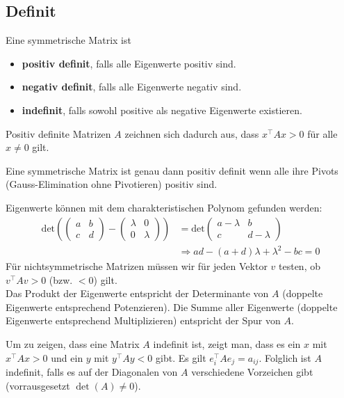 \documentclass[a4paper,10pt]{article}
\begin{document}
\subsection{Definit}
Eine symmetrische Matrix ist
\begin{itemize}
  \item \textbf{positiv definit}, falls alle Eigenwerte positiv sind.
  \item \textbf{negativ definit}, falls alle Eigenwerte negativ sind.
  \item \textbf{indefinit}, falls sowohl positive als negative Eigenwerte existieren.
\end{itemize}

Positiv definite Matrizen $A$ zeichnen sich dadurch aus, dass $x^\top A x > 0$ für alle $x \neq 0$ gilt.

Eine symmetrische Matrix ist genau dann positiv definit wenn alle ihre Pivots (Gauss-Elimination ohne Pivotieren) positiv sind.

Eigenwerte können mit dem charakteristischen Polynom gefunden werden:
\begin{align*}
  \text{det} \left(
  \begin{pmatrix}
    a & b\\
    c & d
  \end{pmatrix}
  -
  \begin{pmatrix}
    \lambda & 0\\
    0 & \lambda
  \end{pmatrix}
  \right)
  &=
  \text{det}
  \begin{pmatrix}
    a - \lambda & b\\
    c & d - \lambda
  \end{pmatrix}\\
  &\Rightarrow ad - (a + d) \lambda + \lambda^2 - bc = 0
\end{align*}
Für nichtsymmetrische Matrizen müssen wir für jeden Vektor \(v\) testen, ob \(v^\top A v > 0\) (bzw. \(< 0\)) gilt.\\
Das Produkt der Eigenwerte entspricht der Determinante von $A$ (doppelte Eigenwerte entsprechend Potenzieren). Die Summe aller Eigenwerte (doppelte Eigenwerte entsprechend Multiplizieren) entspricht der Spur von $A$.

Um zu zeigen, dass eine Matrix $A$ indefinit ist, zeigt man, dass es ein $x$ mit $x^\top A x > 0$ und ein $y$ mit $y^\top A y < 0$ gibt. Es gilt $e_i^\top A e_j = a_{ij}$. Folglich ist $A$ indefinit, falls es auf der Diagonalen von $A$ verschiedene Vorzeichen gibt (vorrausgesetzt $\det(A) \neq 0$).\\
\end{document}
